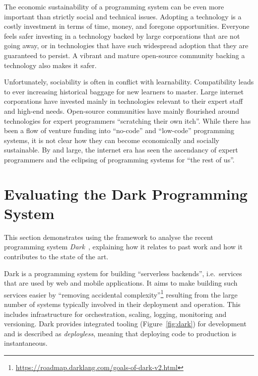 \documentclass[ twoside,openright,titlepage,numbers=noenddot,headinclude,footinclude,cleardoublepage=empty,abstract=on,
                BCOR=5mm,paper=a4,fontsize=11pt
                ]{scrreprt}
\theoremstyle{definition}
\begin{document}
The economic sustainability of a programming system can be even more
important than strictly social and technical issues. Adopting a
technology is a costly investment in terms of time, money, and foregone
opportunities. Everyone feels safer investing in a technology backed by
large corporations that are not going away, or in technologies that have
such widespread adoption that they are guaranteed to persist. A vibrant
and mature open-source community backing a technology also makes it
safer.

Unfortunately, sociability is often in conflict with learnability.
Compatibility leads to ever increasing historical baggage for new
learners to master. Large internet corporations have invested mainly in
technologies relevant to their expert staff and high-end needs.
Open-source communities have mainly flourished around technologies for
expert programmers ``scratching their own itch''. While there has been a
flow of venture funding into ``no-code'' and ``low-code'' programming
systems, it is not clear how they can become economically and socially
sustainable. By and large, the internet era has seen the ascendancy of
expert programmers and the eclipsing of programming systems for ``the
rest of us''.
 
\hypertarget{evaluating-the-dark-programming-system}{\section{Evaluating the Dark Programming
System}\label{evaluating-the-dark-programming-system}}

This section demonstrates using the framework to analyse the recent
programming system \emph{Dark}~\parencite{DarkWeb}, explaining how it
relates to past work and how it contributes to the state of the art.

Dark is a programming system for building ``serverless backends'',
i.e.~services that are used by web and mobile applications. It aims to
make building such services easier by ``removing accidental
complexity''\footnote{\url{https://roadmap.darklang.com/goals-of-dark-v2.html}}
resulting from the large number of systems typically involved in their
deployment and operation. This includes infrastructure for
orchestration, scaling, logging, monitoring and versioning. Dark
provides integrated tooling (Figure~\ref{fig:dark}) for development and
is described as \emph{deployless}, meaning that deploying code to
production is instantaneous.
\end{document}
